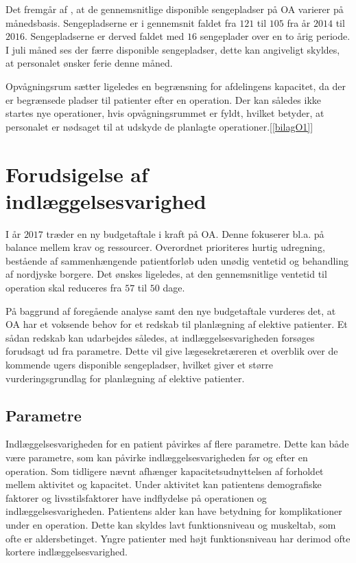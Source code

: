 \noindent
Det fremgår af , at de gennemsnitlige disponible sengepladser på OA varierer på månedsbasis. Sengepladserne er i gennemsnit faldet fra $121$ til $105$ fra år $2014$ til $2016$. Sengepladserne er derved faldet med $16$ sengeplader over en to årig periode. I juli måned ses der færre disponible sengepladser, dette kan angiveligt skyldes, at personalet ønsker ferie denne måned. 

Opvågningsrum sætter ligeledes en begrænsning for afdelingens kapacitet, da der er begrænsede pladser til patienter efter en operation. Der kan således ikke startes nye operationer, hvis opvågningsrummet er fyldt, hvilket betyder, at personalet er nødsaget til at udskyde de planlagte operationer.[\ref{bilagO1}]

\section{Forudsigelse af indlæggelsesvarighed}
I år $2017$ træder en ny budgetaftale i kraft på OA. Denne fokuserer bl.a. på balance mellem krav og ressourcer. Overordnet prioriteres hurtig udregning, bestående af sammenhængende patientforløb uden unødig ventetid og behandling af nordjyske borgere. Det ønskes ligeledes, at den gennemsnitlige ventetid til operation skal reduceres fra $57$ til $50$ dage.\cite{Budget2016}

På baggrund af foregående analyse samt den nye budgetaftale vurderes det, at OA har et voksende behov for et redskab til planlægning af elektive patienter. Et sådan redskab kan udarbejdes således, at indlæggelsesvarigheden forsøges forudsagt ud fra parametre. Dette vil give lægesekretæreren et overblik over de kommende ugers disponible sengepladser, hvilket giver et større vurderingsgrundlag for planlægning af elektive patienter.

\subsection{Parametre}
Indlæggelsesvarigheden for en patient påvirkes af flere parametre. Dette kan både være parametre, som kan påvirke indlæggelsesvarigheden før og efter en operation. Som tidligere nævnt afhænger kapacitetsudnyttelsen af forholdet mellem aktivitet og kapacitet. Under aktivitet kan patientens demografiske faktorer og livsstilsfaktorer have indflydelse på operationen og indlæggelsesvarigheden.
Patientens alder kan have betydning for komplikationer under en operation. Dette kan skyldes lavt funktionsniveau og muskeltab, som ofte er aldersbetinget. Yngre patienter med højt funktionsniveau har derimod ofte kortere indlæggelsesvarighed.\cite{Kehlet2001, Janssen2002}

